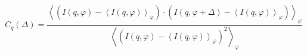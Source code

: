 \documentclass[12pt]{article}
\begin{document}
\begin{equation*}\label{xcca}
C_{q}(\Delta) = \frac{\left\langle \left(I(q,\varphi)-\left\langle I(q,\varphi)\right\rangle_{\varphi}\right)\cdot\left(I(q,\varphi+\Delta)-\left\langle I(q,\varphi)\right\rangle_{\varphi}\right)\right\rangle_{\varphi}}
{\left\langle \left(I(q,\varphi)-\left\langle I(q,\varphi)\right\rangle_{\varphi}\right)^2\right\rangle_{\varphi}}
\end{equation*}
\end{document}
